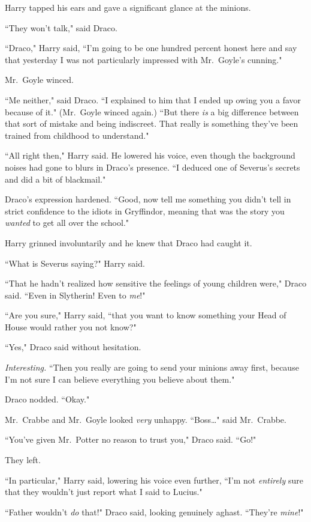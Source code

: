 Harry tapped his ears and gave a significant glance at the minions.

``They won't talk," said Draco.

``Draco," Harry said, ``I'm going to be one hundred percent honest here and say that yesterday I was not particularly impressed with Mr.~Goyle's cunning."

Mr.~Goyle winced.

``Me neither," said Draco. ``I explained to him that I ended up owing you a favor because of it." (Mr.~Goyle winced again.) ``But there \emph{is} a big difference between that sort of mistake and being indiscreet. That really is something they've been trained from childhood to understand."

``All right then," Harry said. He lowered his voice, even though the background noises had gone to blurs in Draco's presence. ``I deduced one of Severus's secrets and did a bit of blackmail."

Draco's expression hardened. ``Good, now tell me something you didn't tell in strict confidence to the idiots in Gryffindor, meaning that was the story you \emph{wanted} to get all over the school."

Harry grinned involuntarily and he knew that Draco had caught it.

``What is Severus saying?" Harry said.

``That he hadn't realized how sensitive the feelings of young children were," Draco said. ``Even in Slytherin! Even to \emph{me}!"

``Are you sure," Harry said, ``that you want to know something your Head of House would rather you not know?"

``Yes," Draco said without hesitation.

\emph{Interesting.} ``Then you really are going to send your minions away first, because I'm not sure I can believe everything you believe about them."

Draco nodded. ``Okay."

Mr.~Crabbe and Mr.~Goyle looked \emph{very} unhappy. ``Boss{\ldots}" said Mr.~Crabbe.

``You've given Mr.~Potter no reason to trust you," Draco said. ``Go!"

They left.

``In particular," Harry said, lowering his voice even further, ``I'm not \emph{entirely} sure that they wouldn't just report what I said to Lucius."

``Father wouldn't \emph{do} that!" Draco said, looking genuinely aghast. ``They're \emph{mine}!"

